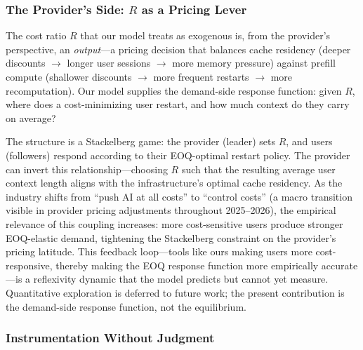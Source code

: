 \documentclass[11pt]{article}
\theoremstyle{definition}
\theoremstyle{remark}
\begin{document}
\subsubsection{The Provider's Side: $R$ as a Pricing Lever}

The cost ratio $R$ that our model treats as exogenous is, from the provider's perspective, an \emph{output}---a pricing decision that balances cache residency (deeper discounts $\rightarrow$ longer user sessions $\rightarrow$ more memory pressure) against prefill compute (shallower discounts $\rightarrow$ more frequent restarts $\rightarrow$ more recomputation). Our model supplies the demand-side response function: given $R$, where does a cost-minimizing user restart, and how much context do they carry on average?

The structure is a Stackelberg game: the provider (leader) sets $R$, and users (followers) respond according to their EOQ-optimal restart policy. The provider can invert this relationship---choosing $R$ such that the resulting average user context length aligns with the infrastructure's optimal cache residency. As the industry shifts from ``push AI at all costs'' to ``control costs'' (a macro transition visible in provider pricing adjustments throughout 2025--2026), the empirical relevance of this coupling increases: more cost-sensitive users produce stronger EOQ-elastic demand, tightening the Stackelberg constraint on the provider's pricing latitude. This feedback loop---tools like ours making users more cost-responsive, thereby making the EOQ response function more empirically accurate---is a reflexivity dynamic that the model predicts but cannot yet measure. Quantitative exploration is deferred to future work; the present contribution is the demand-side response function, not the equilibrium.

\subsubsection{Instrumentation Without Judgment}
\end{document}
